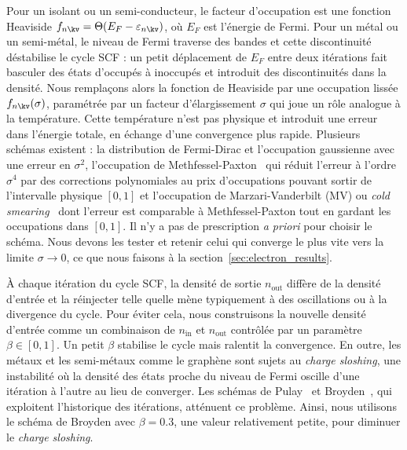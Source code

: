 Pour un isolant ou un semi-conducteur, le facteur d'occupation est une fonction Heaviside $f_{n\kv}=\Theta(E_F-\varepsilon_{n\kv})$, où $E_F$ est l'énergie de Fermi. Pour un métal ou un semi-métal, le niveau de Fermi traverse des bandes et cette discontinuité déstabilise le cycle SCF : un petit déplacement de $E_F$ entre deux itérations fait basculer des états d'occupés à inoccupés et introduit des discontinuités dans la densité. Nous remplaçons alors la fonction de Heaviside par une occupation lissée $f_{n\kv}(\sigma)$, paramétrée par un facteur d'élargissement $\sigma$ qui joue un rôle analogue à la température. Cette température n'est pas physique et introduit une erreur dans l'énergie totale, en échange d'une convergence plus rapide. Plusieurs schémas existent : la distribution de Fermi-Dirac et l'occupation gaussienne avec une erreur en $\sigma^2$, l'occupation de Methfessel-Paxton~\cite{methfesselHighprecisionSamplingBrillouinzone1989} qui réduit l'erreur à l'ordre $\sigma^4$ par des corrections polynomiales au prix d'occupations pouvant sortir de l'intervalle physique $[0,1]$ et l'occupation de Marzari-Vanderbilt (MV) ou \textit{cold smearing}~\cite{marzariThermalContractionDisordering1999} dont l'erreur est comparable à Methfessel-Paxton tout en gardant les occupations dans $[0,1]$. Il n'y a pas de prescription \textit{a priori} pour choisir le schéma. Nous devons les tester et retenir celui qui converge le plus vite vers la limite $\sigma\to 0$, ce que nous faisons à la section~\ref{sec:electron_results}.



À chaque itération du cycle SCF, la densité de sortie $n_\text{out}$ diffère de la densité d'entrée et la réinjecter telle quelle mène typiquement à des oscillations ou à la divergence du cycle. Pour éviter cela, nous construisons la nouvelle densité d'entrée comme un combinaison de $n_\text{in}$ et $n_\text{out}$ contrôlée par un paramètre $\beta\in[0,1]$. Un petit $\beta$ stabilise le cycle mais ralentit la convergence. En outre, les métaux et les semi-métaux comme le graphène sont sujets au \textit{charge sloshing}, une instabilité où la densité des états proche du niveau de Fermi oscille d'une itération à l'autre au lieu de converger. Les schémas de Pulay~\cite{pulayConvergenceAccelerationIterative1980} et Broyden~\cite{Broyden1965Class}, qui exploitent l'historique des itérations, atténuent ce problème. Ainsi, nous utilisons le schéma de Broyden avec $\beta=0.3$, une valeur relativement petite, pour diminuer le \textit{charge sloshing}.

